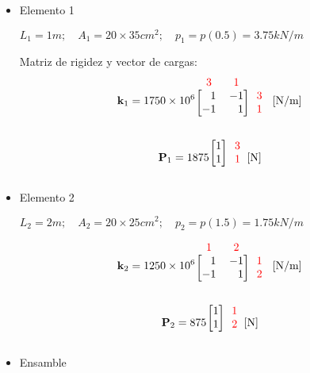 \begin{example}
\begin{itemize}
\begin{itemize}
	\item Elemento 1
	
	$L_1 = 1 \unit{m}; \quad A_1 = 20\times 35 \unit{cm^2}; \quad p_1 = p(0.5) = 3.75 \unit{kN/m}$
	
	Matriz de rigidez y vector de cargas:
	$$
	\mathbf{k}_1 = \num{1750e6} \begin{blockarray}{ccc}
		\color{red} 3 & \color{red} 1\\
		\begin{block}{[rr]c}
			1 & -1 & \color{red} 3\\
			-1 & 1 & \color{red} 1\\
		\end{block}
	\end{blockarray} \ \unit{[N/m]}
	$$
	
	$$\mathbf{P}_1 = 1875  \begin{blockarray}{cc}
		\begin{block}{[r]c}
			1 & \color{red} 3 \\ 1 & \color{red} 1\\
		\end{block}
	\end{blockarray} [\unit{N}]$$
	
	\item Elemento 2
	
	$L_2 = 2 \unit{m}; \quad A_2 = 20\times 25 \unit{cm^2}; \quad p_2 = p(1.5) = 1.75 \unit{kN/m}$
	
		$$
	\mathbf{k}_2 = \num{1250e6} \begin{blockarray}{ccc}
		\color{red} 1 & \color{red} 2\\
		\begin{block}{[rr]c}
			1 & -1 & \color{red} 1\\
			-1 & 1 & \color{red} 2\\
		\end{block}
	\end{blockarray} \ \unit{[N/m]}
	$$
	
	$$\mathbf{P}_2 = 875  \begin{blockarray}{cc}
		\begin{block}{[r]c}
			1 & \color{red} 1 \\ 1 & \color{red} 2\\
		\end{block}
	\end{blockarray} [\unit{N}]$$

\item Ensamble


\end{itemize}
\end{itemize}
\end{example}
